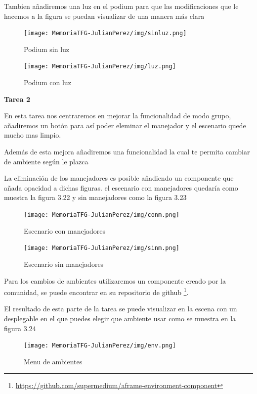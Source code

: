 \documentclass[a4paper, 12pt]{book}
\begin{document}
Tambien añadiremos una luz en el podium para que las modificaciones que le hacemos a la figura se puedan visualizar de una manera más clara

\begin{figure}[H]
  \centering
  \begin{minipage}[b]{0.4\textwidth}
 \texttt{[image: MemoriaTFG-JulianPerez/img/sinluz.png]}
  \caption{Podium sin luz}\label{single}
  \end{minipage}
  \hfill
  \begin{minipage}[b]{0.4\textwidth}
  \texttt{[image: MemoriaTFG-JulianPerez/img/luz.png]}
  \caption{Podium con luz}\label{scrum}
  \end{minipage}
\end{figure}

\textbf{Tarea 2}

En esta tarea nos centraremos en mejorar la funcionalidad de modo grupo, añadiremos un botón para así poder eleminar el manejador y el escenario quede mucho mas limpio.

Además de esta mejora añadiremos una funcionalidad la cual te permita cambiar de ambiente según le plazca 

La eliminación de los manejadores es posible añadiendo un componente que añada opacidad a dichas figuras. el escenario con manejadores quedaría como muestra la figura 3.22 y sin manejadores como la figura 3.23

\begin{figure}[H]
  \centering
  \begin{minipage}[b]{0.4\textwidth}
 \texttt{[image: MemoriaTFG-JulianPerez/img/conm.png]}
  \caption{Escenario con manejadores}\label{single}
  \end{minipage}
  \hfill
  \begin{minipage}[b]{0.4\textwidth}
  \texttt{[image: MemoriaTFG-JulianPerez/img/sinm.png]}
  \caption{Escenario sin manejadores}\label{scrum}
  \end{minipage}
\end{figure}

Para los cambios de ambientes utilizaremos un componente creado por la comunidad, se puede encontrar en su repositorio de github \footnote{\url{https://github.com/supermedium/aframe-environment-component}}. 

El resultado de esta parte de la tarea se puede visualizar en la escena con un desplegable en el que puedes elegir que ambiente usar como se muestra en la figura 3.24

\begin{figure}[H]
  \centering
  \texttt{[image: MemoriaTFG-JulianPerez/img/env.png]}
  \caption{Menu de ambientes}\label{menu2}
\end{figure}
\end{document}
